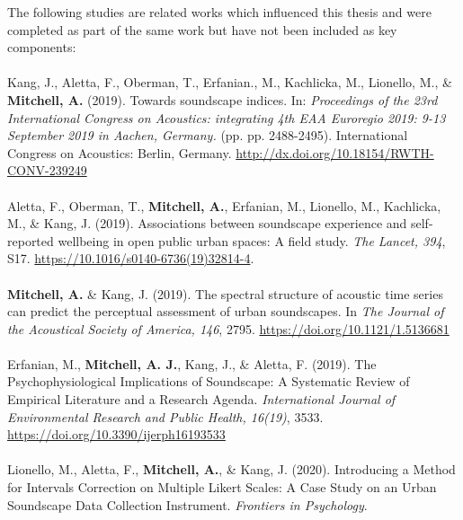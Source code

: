\documentclass[twoside,fontsize=11pt,titlepage,chapterprefix=true
]{scrbook}
\begin{document}

\newpage
The following studies are related works which influenced this thesis and were completed as part of the same work but have not been included as key components:

\paragraph*{}
Kang, J., Aletta, F., Oberman, T., Erfanian., M., Kachlicka, M., Lionello, M., \& \textbf{Mitchell, A.} (2019). Towards soundscape indices. In: \emph{Proceedings of the 23rd International Congress on Acoustics: integrating 4th EAA Euroregio 2019: 9-13 September 2019 in Aachen, Germany.} (pp. pp. 2488-2495). International Congress on Acoustics: Berlin, Germany. \url{http://dx.doi.org/10.18154/RWTH-CONV-239249}

\paragraph*{}
Aletta, F., Oberman, T., \textbf{Mitchell, A.}, Erfanian, M., Lionello, M., Kachlicka, M., \& Kang, J. (2019). Associations between soundscape experience and self-reported wellbeing in open public urban spaces: A field study. \emph{The Lancet, 394}, S17. \url{https://10.1016/s0140-6736(19)32814-4}.

\paragraph*{}
\textbf{Mitchell, A.} \& Kang, J. (2019). The spectral structure of acoustic time series can predict the perceptual assessment of urban soundscapes. In \emph{The Journal of the Acoustical Society of America, 146}, 2795. \url{https://doi.org/10.1121/1.5136681}

\paragraph*{}
Erfanian, M., \textbf{Mitchell, A. J.}, Kang, J., \& Aletta, F. (2019). The Psychophysiological Implications of Soundscape: A Systematic Review of Empirical Literature and a Research Agenda. \emph{International Journal of Environmental Research and Public Health, 16(19)}, 3533. \url{https://doi.org/10.3390/ijerph16193533}

\paragraph*{}
Lionello, M., Aletta, F., \textbf{Mitchell, A.}, \& Kang, J. (2020). Introducing a Method for Intervals Correction on Multiple Likert Scales: A Case Study on an Urban Soundscape Data Collection Instrument. \emph{Frontiers in Psychology}.
\end{document}
